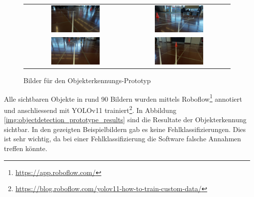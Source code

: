 \documentclass[../main.tex]{subfiles}
\begin{document}
\begin{figure}[H]
\begin{center}
\begin{tabular}{cc}
    \includegraphics[width=0.5\textwidth]{img/prototyping/objekterkennung/Bild1.jpg} &
    \includegraphics[width=0.5\textwidth]{img/prototyping/objekterkennung/Bild2.jpg} \\
    \includegraphics[width=0.5\textwidth]{img/prototyping/objekterkennung/Bild3.jpg} &
    \includegraphics[width=0.5\textwidth]{img/prototyping/objekterkennung/Bild4.jpg}
\end{tabular}
\caption{Bilder für den Objekterkennungs-Prototyp}
\label{img:objectdetection_prototype_images}
\end{center}
\end{figure}

Alle sichtbaren Objekte in rund 90 Bildern wurden mittels Roboflow\footnote{\url{https://app.roboflow.com/}} annotiert und anschliessend mit YOLOv11 trainiert\footnote{\url{https://blog.roboflow.com/yolov11-how-to-train-custom-data/}}.  
In Abbildung \ref{img:objectdetection_prototype_results} sind die Resultate der Objekterkennung sichtbar. In den gezeigten Beispielbildern gab es keine Fehlklassifizierungen. Dies ist sehr wichtig, da bei einer Fehlklassifizierung die Software falsche Annahmen treffen könnte.
\end{document}
